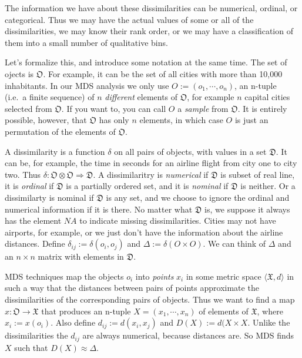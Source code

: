 \documentclass[
  12pt,
  letterpaper,
  DIV=11,
  numbers=noendperiod]{scrartcl}
\begin{document}
The information we have about these dissimilarities can be numerical,
ordinal, or categorical. Thus we may have the actual values of some or
all of the dissimilarities, we may know their rank order, or we may have
a classification of them into a small number of qualitative bins.

Let's formalize this, and introduce some notation at the same time. The
set of ojects is \(\mathfrak{O}\). For example, it can be the set of all
cities with more than 10,000 inhabitants. In our MDS analysis we only
use \(O:=(o_1,\cdots,o_n)\), an n-tuple (i.e.~a finite sequence) of
\(n\) \emph{different} elements of \(\mathfrak{O}\), for example \(n\)
capital cities selected from \(\mathfrak{O}\). If you want to, you can
call \(O\) a \emph{sample} from \(\mathfrak{O}\). It is entirely
possible, however, that \(\mathfrak{O}\) has only \(n\) elements, in
which case \(O\) is just an permutation of the elements of
\(\mathfrak{O}\).

A dissimilarity is a function \(\delta\) on all pairs of objects, with
values in a set \(\mathfrak{D}\). It can be, for example, the time in
seconds for an airline flight from city one to city two. Thus
\(\delta:\mathfrak{O}\otimes\mathfrak{O}\Rightarrow\mathfrak{D}\). A
dissimilaritry is \emph{numerical} if \(\mathfrak{D}\) is subset of real
line, it is \emph{ordinal} if \(\mathfrak{D}\) is a partially ordered
set, and it is \emph{nominal} if \(\mathfrak{D}\) is neither. Or a
dissimilarty is nominal if \(\mathfrak{D}\) is any set, and we choose to
ignore the ordinal and numerical information if it is there. No matter
what \(\mathfrak{D}\) is, we suppose it always has the element
\(\mathit{NA}\) to indicate missing dissimilarities. Cities may not have
airports, for example, or we just don't have the information about the
airline distances. Define \(\delta_{ij}:=\delta(o_i,o_j)\) and
\(\Delta:=\delta(O\times O)\). We can think of \(\Delta\) and an
\(n\times n\) matrix with elements in \(\mathfrak{D}\).

MDS techniques map the objects \(o_i\) into \emph{points} \(x_i\) in
some metric space \(\langle\mathfrak{X},d\rangle\) in such a way that
the distances between pairs of points approximate the dissimilarities of
the corresponding pairs of objects. Thus we want to find a map
\(x:\mathfrak{O}\rightarrow\mathfrak{X}\) that produces an n-tuple
\(X=(x_1,\cdots,x_n)\) of elements of \(\mathfrak{X}\), where
\(x_i:=x(o_i)\). Also define \(d_{ij}:=d(x_i,x_j)\) and
\(D(X):=d(X\times X\). Unlike the dissimilarities the \(d_{ij}\) are
always numerical, because distances are. So MDS finds \(X\) such that
\(D(X)\approx\Delta\).
\end{document}
